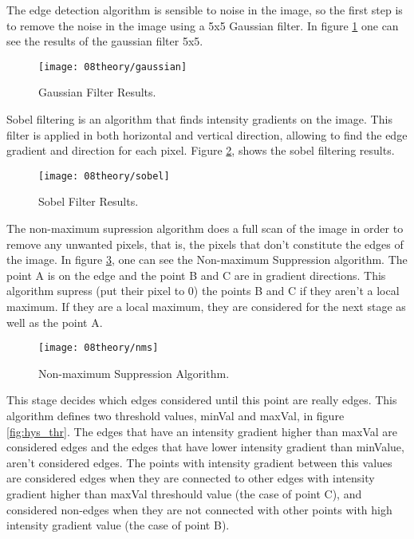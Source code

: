 The edge detection algorithm is sensible to noise in the image, so the first step is to remove the noise in the image using a 5x5 Gaussian filter. In figure \ref{fig:gaussian} one can see the results of the gaussian filter 5x5. 

\begin{figure}[H]
	\centering
	\texttt{[image: 08theory/gaussian]}
	\caption{Gaussian Filter Results.}
	\label{fig:gaussian}
\end{figure}

Sobel filtering is an algorithm that finds intensity gradients on the image. This filter is applied in both horizontal and vertical direction, allowing to find the edge gradient and direction for each pixel. Figure \ref{fig:sobel}, shows the sobel filtering results.

\begin{figure}[H]
	\centering
	\texttt{[image: 08theory/sobel]}
	\caption{Sobel Filter Results.}
	\label{fig:sobel}
\end{figure}

The non-maximum supression algorithm does a full scan of the image in order to remove any unwanted pixels, that is, the pixels that don't constitute the edges of the image. In figure \ref{fig:nms}, one can see the Non-maximum Suppression algorithm. The point A is on the edge and the point B and C are in gradient directions. This algorithm supress (put their pixel to 0) the points B and C if they aren't a local maximum. If they are a local maximum, they are considered for the next stage as well as the point A.

\begin{figure}[H]
	\centering
	\texttt{[image: 08theory/nms]}
	\caption{Non-maximum Suppression Algorithm.}
	\label{fig:nms}
\end{figure}

This stage decides which edges considered until this point are really edges. This algorithm defines two threshold values, minVal and maxVal, in figure \ref{fig:hys_thr}. The edges that have an intensity gradient higher than maxVal are considered edges and the edges that have lower intensity gradient than minValue, aren't considered edges. The points with intensity gradient between this values are considered edges when they are connected to other edges with intensity gradient higher than maxVal threshould value (the case of point C), and considered non-edges when they are not connected with other points with high intensity gradient value (the case of point B). 

